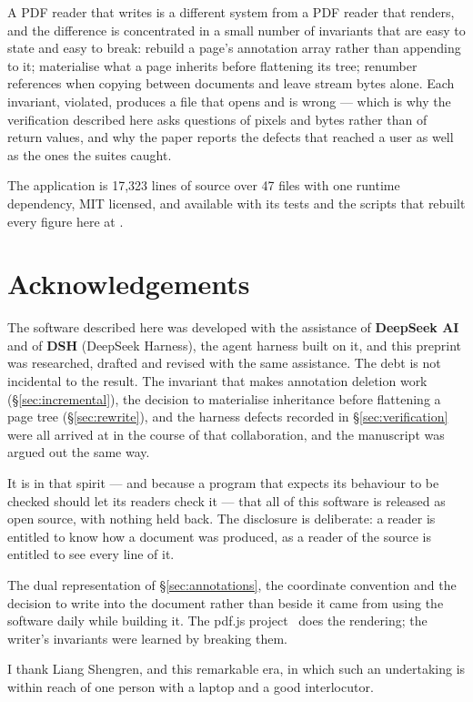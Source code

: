 A PDF reader that writes is a different system from a PDF reader that renders, and the
difference is concentrated in a small number of invariants that are easy to state and easy to
break: rebuild a page's annotation array rather than appending to it; materialise what a page
inherits before flattening its tree; renumber references when copying between documents and
leave stream bytes alone. Each invariant, violated, produces a file that opens and is wrong ---
which is why the verification described here asks questions of pixels and bytes rather than of
return values, and why the paper reports the defects that reached a user as well as the ones
the suites caught.

The application is 17{,}323 lines of source over 47 files with one runtime dependency, MIT
licensed, and available with its tests and the scripts that rebuilt every figure here at \repo.

\section*{Acknowledgements}

The software described here was developed with the assistance of \textbf{DeepSeek AI} and of
\textbf{DSH} (DeepSeek Harness), the agent harness built on it, and this preprint was
researched, drafted and revised with the same assistance. The debt is not incidental to the
result. The invariant that makes annotation deletion work (\S\ref{sec:incremental}), the
decision to materialise inheritance before flattening a page tree (\S\ref{sec:rewrite}), and
the harness defects recorded in \S\ref{sec:verification} were all arrived at in the course of
that collaboration, and the manuscript was argued out the same way.

It is in that spirit --- and because a program that expects its behaviour to be checked should
let its readers check it --- that all of this software is released as open source, with nothing
held back. The disclosure is deliberate: a reader is entitled to know how a document was
produced, as a reader of the source is entitled to see every line of it.

The dual representation of \S\ref{sec:annotations}, the coordinate convention and the decision
to write into the document rather than beside it came from using the software daily while
building it. The pdf.js project~\cite{pdfjs} does the rendering; the writer's invariants were
learned by breaking them.

I thank Liang Shengren, and this remarkable era, in which such an undertaking is within
reach of one person with a laptop and a good interlocutor.

